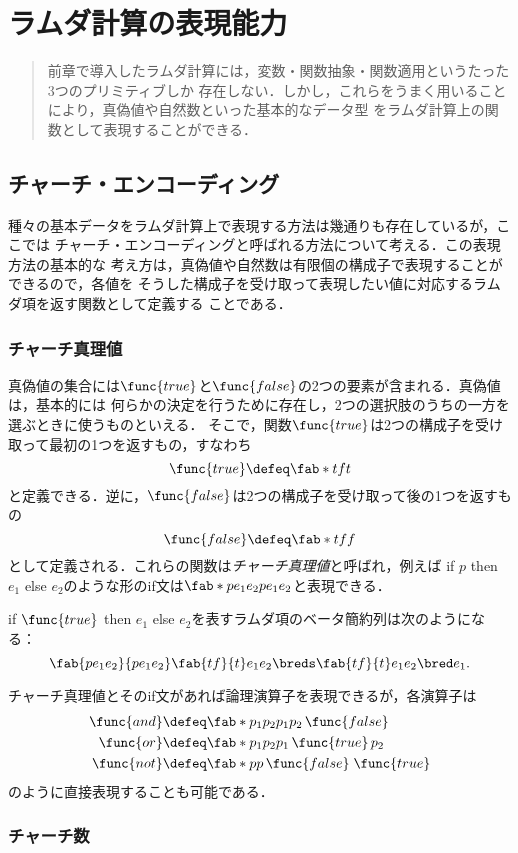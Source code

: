 \documentclass[uplatex,dvipdfmx,report,fleqn]{jsbook}
\begin{document}
\chapter{ラムダ計算の表現能力}

\begin{abstract}
前章で導入したラムダ計算には，変数・関数抽象・関数適用というたった3つのプリミティブしか
存在しない．しかし，これらをうまく用いることにより，真偽値や自然数といった基本的なデータ型
をラムダ計算上の関数として表現することができる．
\end{abstract}

\section{チャーチ・エンコーディング}

種々の基本データをラムダ計算上で表現する方法は幾通りも存在しているが，ここでは
チャーチ・エンコーディングと呼ばれる方法について考える．この表現方法の基本的な
考え方は，真偽値や自然数は有限個の構成子で表現することができるので，各値を
そうした構成子を受け取って表現したい値に対応するラムダ項を返す関数として定義する
ことである．

\subsection{チャーチ真理値}

真偽値の集合には$\func{true}$と$\func{false}$の2つの要素が含まれる．真偽値は，基本的には
何らかの決定を行うために存在し，2つの選択肢のうちの一方を選ぶときに使うものといえる．
そこで，関数$\func{true}$は2つの構成子を受け取って最初の1つを返すもの，すなわち
\[
\func{true} \defeq \fab*{tf}{t}
\]
と定義できる．逆に，$\func{false}$は2つの構成子を受け取って後の1つを返すもの
\[
\func{false} \defeq \fab*{tf}{f}
\]
として定義される．これらの関数は\emph{チャーチ真理値}と呼ばれ，例えば
if $p$ then $e_1$ else $e_2$のような形のif文は$\fab*{pe_1e_2}{pe_1e_2}$と表現できる．
%
\begin{example}
if $\func{true}$ then $e_1$ else $e_2$を表すラムダ項のベータ簡約列は次のようになる：
\[
\fab{pe_1e_2}{pe_1e_2}\fab{tf}{t}e_1e_2 \breds \fab{tf}{t}e_1e_2 \bred e_1.
\]
\end{example}

チャーチ真理値とそのif文があれば論理演算子を表現できるが，各演算子は
%
\begin{align*}
\func{and} &\defeq \fab*{p_1p_2}{p_1p_2\,\func{false}} \\
\func{or} &\defeq \fab*{p_1p_2}{p_1\,\func{true}\,p_2} \\
\func{not} &\defeq \fab*{p}{p\,\func{false}\;\func{true}}
\end{align*}
%
のように直接表現することも可能である．

\subsection{チャーチ数}



\NeedsRevision
\end{document}
